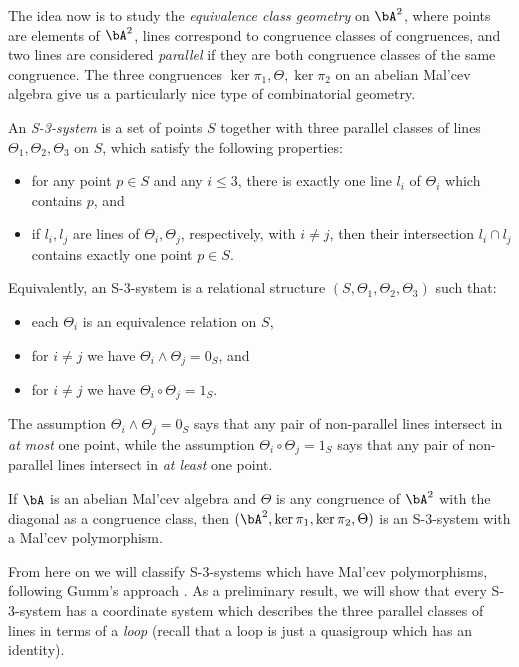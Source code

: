 
The idea now is to study the \emph{equivalence class geometry} on $\bA^2$, where points are elements of $\bA^2$, lines correspond to congruence classes of congruences, and two lines are considered \emph{parallel} if they are both congruence classes of the same congruence. The three congruences $\ker \pi_1, \Theta, \ker \pi_2$ on an abelian Mal'cev algebra give us a particularly nice type of combinatorial geometry.

\begin{defn} An \emph{S-3-system} is a set of points $S$ together with three parallel classes of lines $\Theta_1, \Theta_2, \Theta_3$ on $S$, which satisfy the following properties:
\begin{itemize}
\item for any point $p \in S$ and any $i \le 3$, there is exactly one line $l_i$ of $\Theta_i$ which contains $p$, and

\item if $l_i, l_j$ are lines of $\Theta_i, \Theta_j$, respectively, with $i \ne j$, then their intersection $l_i \cap l_j$ contains exactly one point $p \in S$.
\end{itemize}
Equivalently, an S-3-system is a relational structure $(S,\Theta_1,\Theta_2,\Theta_3)$ such that:
\begin{itemize}
\item each $\Theta_i$ is an equivalence relation on $S$,

\item for $i \ne j$ we have $\Theta_i \wedge \Theta_j = 0_S$, and

\item for $i \ne j$ we have $\Theta_i \circ \Theta_j = 1_S$.
\end{itemize}
The assumption $\Theta_i \wedge \Theta_j = 0_S$ says that any pair of non-parallel lines intersect in \emph{at most} one point, while the assumption $\Theta_i \circ \Theta_j = 1_S$ says that any pair of non-parallel lines intersect in \emph{at least} one point.
\end{defn}

\begin{cor} If $\bA$ is an abelian Mal'cev algebra and $\Theta$ is any congruence of $\bA^2$ with the diagonal as a congruence class, then $(\bA^2, \ker \pi_1, \ker \pi_2, \Theta)$ is an S-3-system with a Mal'cev polymorphism.
\end{cor}

From here on we will classify S-3-systems which have Mal'cev polymorphisms, following Gumm's approach \cite{abelian-malcev-affine}. As a preliminary result, we will show that every S-3-system has a coordinate system which describes the three parallel classes of lines in terms of a \emph{loop} (recall that a loop is just a quasigroup which has an identity).

